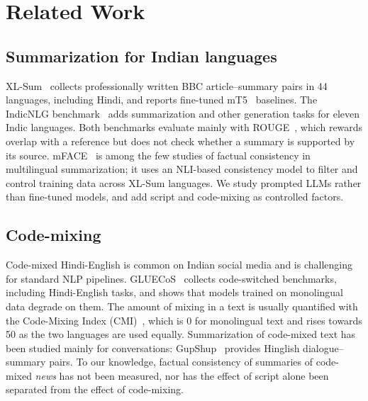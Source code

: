 \section{Related Work}

\subsection{Summarization for Indian languages}
XL-Sum~\cite{hasan2021xlsum} collects professionally written BBC article--summary pairs in 44 languages, including Hindi, and reports fine-tuned mT5~\cite{xue2021mt5} baselines. The IndicNLG benchmark~\cite{kumar2022indicnlg} adds summarization and other generation tasks for eleven Indic languages. Both benchmarks evaluate mainly with ROUGE~\cite{lin2004rouge}, which rewards overlap with a reference but does not check whether a summary is supported by its source. mFACE~\cite{aharoni2023mface} is among the few studies of factual consistency in multilingual summarization; it uses an NLI-based consistency model to filter and control training data across XL-Sum languages. We study prompted LLMs rather than fine-tuned models, and add script and code-mixing as controlled factors.

\subsection{Code-mixing}
Code-mixed Hindi-English is common on Indian social media and is challenging for standard NLP pipelines. GLUECoS~\cite{khanuja2020gluecos} collects code-switched benchmarks, including Hindi-English tasks, and shows that models trained on monolingual data degrade on them. The amount of mixing in a text is usually quantified with the Code-Mixing Index (CMI)~\cite{das2014identifying,gamback2016comparing}, which is 0 for monolingual text and rises towards 50 as the two languages are used equally. Summarization of code-mixed text has been studied mainly for conversations: GupShup~\cite{mehnaz2021gupshup} provides Hinglish dialogue--summary pairs. To our knowledge, factual consistency of summaries of code-mixed \emph{news} has not been measured, nor has the effect of script alone been separated from the effect of code-mixing.

